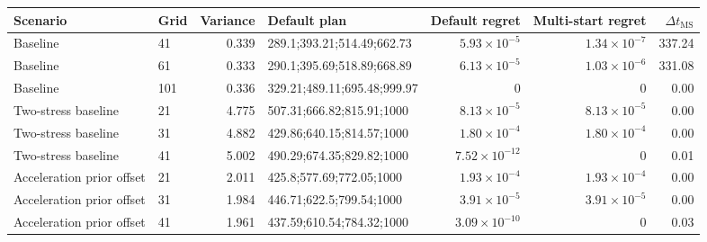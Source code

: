 \begin{tabular}{llrlrrr}
\toprule
Scenario & Grid & Variance & Default plan & Default regret & Multi-start regret & $\Delta t_{\mathrm{MS}}$ \\
\midrule
Baseline & 41 & 0.339 & 289.1;393.21;514.49;662.73 & $5.93\times10^{-5}$ & $1.34\times10^{-7}$ & 337.24 \\
Baseline & 61 & 0.333 & 290.1;395.69;518.89;668.89 & $6.13\times10^{-5}$ & $1.03\times10^{-6}$ & 331.08 \\
Baseline & 101 & 0.336 & 329.21;489.11;695.48;999.97 & $0$ & $0$ & 0.00 \\
\midrule
Two-stress baseline & 21 & 4.775 & 507.31;666.82;815.91;1000 & $8.13\times10^{-5}$ & $8.13\times10^{-5}$ & 0.00 \\
Two-stress baseline & 31 & 4.882 & 429.86;640.15;814.57;1000 & $1.80\times10^{-4}$ & $1.80\times10^{-4}$ & 0.00 \\
Two-stress baseline & 41 & 5.002 & 490.29;674.35;829.82;1000 & $7.52\times10^{-12}$ & $0$ & 0.01 \\
Acceleration prior offset & 21 & 2.011 & 425.8;577.69;772.05;1000 & $1.93\times10^{-4}$ & $1.93\times10^{-4}$ & 0.00 \\
Acceleration prior offset & 31 & 1.984 & 446.71;622.5;799.54;1000 & $3.91\times10^{-5}$ & $3.91\times10^{-5}$ & 0.00 \\
Acceleration prior offset & 41 & 1.961 & 437.59;610.54;784.32;1000 & $3.09\times10^{-10}$ & $0$ & 0.03 \\
\bottomrule
\end{tabular}

